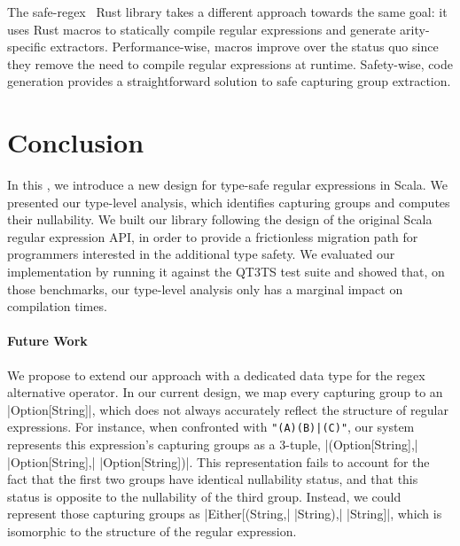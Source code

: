 The safe-regex~\citep{leonhard2021safe} Rust library takes a different approach towards the same goal: it uses Rust macros to statically compile regular expressions and generate arity-specific extractors.
Performance-wise, macros improve over the status quo since they remove the need to compile regular expressions at runtime.
Safety-wise, code generation provides a straightforward solution to safe capturing group extraction.

\section{Conclusion}
\label{sec:conclusion}

In this \paper, we introduce a new design for type-safe regular expressions in Scala.
We presented our type-level analysis, which identifies capturing groups and computes their nullability.
We built our library following the design of the original Scala regular expression API, in order to provide a frictionless migration path for programmers interested in the additional type safety.
We evaluated our implementation by running it against the QT3TS test suite and showed that, on those benchmarks, our type-level analysis only has a marginal impact on compilation times.

\paragraph{Future Work}
We propose to extend our approach with a dedicated data type for the regex alternative operator.
In our current design, we map every capturing group to an |Option[String]|, which does not always accurately reflect the structure of regular expressions.
For instance, when confronted with \lstinline!"(A)(B)|(C)"!, our system represents this expression's capturing groups as a 3-tuple, |(Option[String],| |Option[String],| |Option[String])|. This representation fails to account for the fact that the first two groups have identical nullability status, and that this status is opposite to the nullability of the third group.
Instead, we could represent those capturing groups as |Either[(String,| |String),| |String]|, which is isomorphic to the structure of the regular expression.
